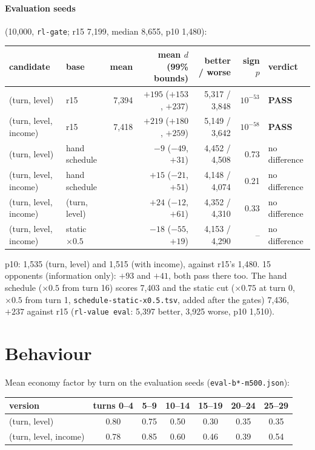 \documentclass{../polyexp}
\begin{document}
\paragraph{Evaluation seeds} (10{,}000, \texttt{rl-gate}; r15 7{,}199, median 8{,}655, p10 1{,}480):

\begin{center}\small
\begin{tabular}{llrrrrl}
\toprule
candidate & base & mean & mean $d$ (99\% bounds) & better / worse & sign $p$ & verdict \\
\midrule
(turn, level)         & r15 & 7{,}394 & $+195$ ($+153$, $+237$) & 5{,}317 / 3{,}848 & $10^{-53}$ & \textbf{PASS} \\
(turn, level, income) & r15 & 7{,}418 & $+219$ ($+180$, $+259$) & 5{,}149 / 3{,}642 & $10^{-58}$ & \textbf{PASS} \\
(turn, level)         & hand schedule & & $-9$ ($-49$, $+31$) & 4{,}452 / 4{,}508 & 0.73 & no difference \\
(turn, level, income) & hand schedule & & $+15$ ($-21$, $+51$) & 4{,}148 / 4{,}074 & 0.21 & no difference \\
(turn, level, income) & (turn, level)  & & $+24$ ($-12$, $+61$) & 4{,}352 / 4{,}310 & 0.33 & no difference \\
(turn, level, income) & static $\times0.5$ & & $-18$ ($-55$, $+19$) & 4{,}153 / 4{,}290 & -- & no difference \\
\bottomrule
\end{tabular}
\end{center}

p10: 1{,}535 (turn, level) and 1{,}515 (with income), against r15's 1{,}480. 15 opponents (information only):
$+93$ and $+41$, both pass there too. The hand schedule ($\times0.5$ from turn 16) scores 7{,}403 and the static cut
($\times0.75$ at turn 0, $\times0.5$ from turn 1, \texttt{schedule-static-x0.5.tsv}, added after the gates) 7{,}436,
$+237$ against r15 (\texttt{rl-value eval}: 5{,}397 better, 3{,}925 worse, p10 1{,}510).

\section{Behaviour}
Mean economy factor by turn on the evaluation seeds (\texttt{eval-b*-m500.json}):

\begin{center}\small
\begin{tabular}{lcccccc}
\toprule
version & turns 0--4 & 5--9 & 10--14 & 15--19 & 20--24 & 25--29 \\
\midrule
(turn, level)         & 0.80 & 0.75 & 0.50 & 0.30 & 0.35 & 0.35 \\
(turn, level, income) & 0.78 & 0.85 & 0.60 & 0.46 & 0.39 & 0.54 \\
\bottomrule
\end{tabular}
\end{center}
\end{document}

